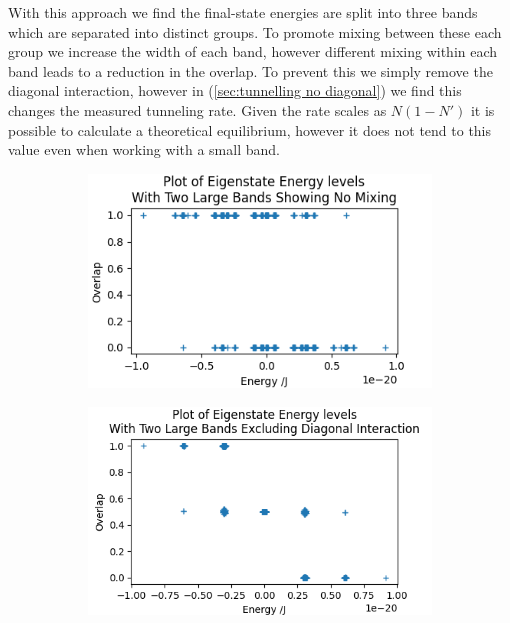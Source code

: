 With this approach
we find the final-state
energies are split into three
bands which are separated
into distinct groups. To
promote mixing between these
each group we increase the width
of each band, however different mixing
within each band leads to a
reduction in the overlap.
To prevent this
we simply remove the diagonal
interaction, however in (\cref{sec:tunnelling no diagonal})
we find this changes the
measured tunneling rate.
Given the rate scales as
\(N(1-N')\) it is possible to
calculate a theoretical equilibrium,
however it does not tend to this value
even when
working with a small band.
\begin{figure}[htbp]
    \centering
    \begin{subfigure}{0.45\linewidth}
        \includegraphics[width=0.9\linewidth]{Figures/Simulation/Two Large Bands No Mixing.png}
        \label{fig:two band minimum mixing}
    \end{subfigure}
    \begin{subfigure}{0.45\linewidth}
        \includegraphics[width=0.9\linewidth]{Figures/Simulation/Two Large Bands No Diagonal.png}
        \label{fig:two band no diagonal}

\end{subfigure}
\end{figure}
